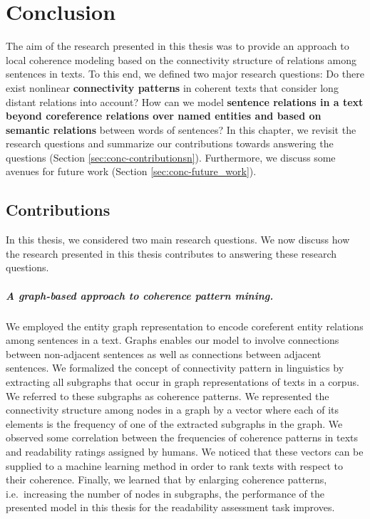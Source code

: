 
\chapter{Conclusion} 
\label{ch:conc} 
The aim of the research presented in this thesis was to provide an approach to local coherence modeling based on the connectivity structure of relations among sentences in  texts. 
To this end, we defined two major research questions: Do there exist nonlinear \textbf{connectivity patterns} in coherent texts that consider long distant relations into account? 
How can we model \textbf{sentence relations in a text beyond coreference relations over named entities and based on semantic relations} between words of sentences? 
In this chapter, we revisit the research questions and summarize our contributions towards answering the questions (Section \ref{sec:conc-contributionsn}). 
Furthermore, we discuss some avenues for future work (Section \ref{sec:conc-future_work}).

\section{Contributions}
\label{sec:conc-contributions}


In this thesis, we considered two main research questions. 
We now discuss how the research presented in this thesis contributes to answering these research questions.

\paragraph{A graph-based approach to coherence pattern mining.} 
We employed the entity graph representation to encode coreferent entity relations among sentences in a text. 
Graphs enables our model to involve connections between non-adjacent sentences as well as connections between adjacent sentences. 
We formalized the concept of connectivity pattern in linguistics \cite{danes74a} by extracting all subgraphs that occur in graph representations of texts in a corpus. 
We referred to these subgraphs as coherence patterns. 
We represented the connectivity structure among nodes in a graph by a vector where each of its elements is the frequency of one of the extracted subgraphs in the graph. 
We observed some correlation between the frequencies of coherence patterns in texts and  readability ratings assigned by humans. 
We noticed that these vectors can be supplied to a machine learning method in order to rank texts with respect to their coherence. 
Finally, we learned that by enlarging coherence patterns, i.e.\ increasing the number of nodes in subgraphs, the performance of the presented model in this thesis for the readability assessment task improves. 


